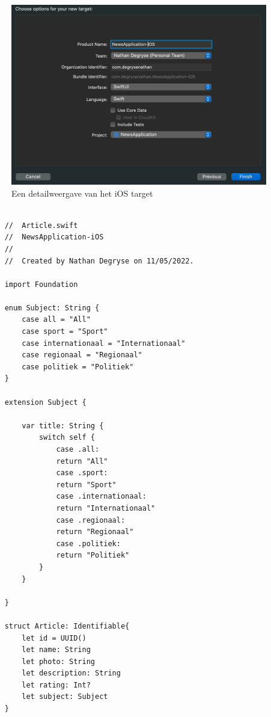 \begin{figure}[h]
    \centering
    \includegraphics[width=\linewidth]{img/iostargetdetail.png}
    \caption{Een detailweergave van het iOS target}
\end{figure}

\begin{lstlisting}
    
    //  Article.swift
    //  NewsApplication-iOS
    //
    //  Created by Nathan Degryse on 11/05/2022.
    
    import Foundation
    
    enum Subject: String {
        case all = "All"
        case sport = "Sport"
        case internationaal = "Internationaal"
        case regionaal = "Regionaal"
        case politiek = "Politiek"
    }
    
    extension Subject {
        
        var title: String {
            switch self {
                case .all:
                return "All"
                case .sport:
                return "Sport"
                case .internationaal:
                return "Internationaal"
                case .regionaal:
                return "Regionaal"
                case .politiek:
                return "Politiek"
            }
        }
        
    }
    
    struct Article: Identifiable{
        let id = UUID()
        let name: String
        let photo: String
        let description: String
        let rating: Int?
        let subject: Subject
    }
    
\end{lstlisting}

